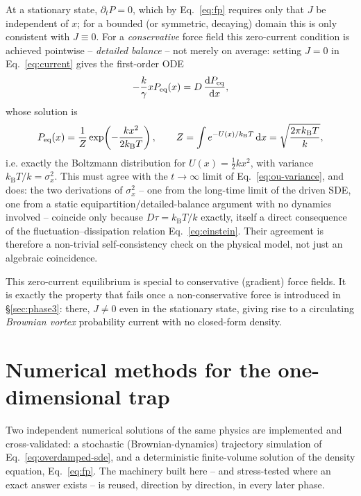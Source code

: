 \documentclass[11pt]{article}
\newcommand{\dd}{\mathrm{d}}
\newcommand{\kB}{k_{\mathrm{B}}}
\begin{document}
At a stationary state, $\partial_t P = 0$, which by Eq.~\eqref{eq:fp} requires only that $J$ be independent of $x$; for a bounded (or symmetric, decaying) domain this is only consistent with $J \equiv 0$. For a \emph{conservative} force field this zero-current condition is achieved pointwise -- \emph{detailed balance} -- not merely on average: setting $J=0$ in Eq.~\eqref{eq:current} gives the first-order ODE
\begin{equation}
-\frac{k}{\gamma}xP_{\rm eq}(x) = D\,\frac{\dd P_{\rm eq}}{\dd x},
\end{equation}
whose solution is
\begin{equation}
P_{\rm eq}(x) = \frac{1}{Z}\exp\!\left(-\frac{kx^2}{2\kB T}\right), \qquad Z = \int e^{-U(x)/\kB T}\,\dd x = \sqrt{\frac{2\pi \kB T}{k}},
\label{eq:boltzmann}
\end{equation}
i.e. exactly the Boltzmann distribution for $U(x)=\tfrac12 kx^2$, with variance $\kB T/k = \sigma_x^2$. This must agree with the $t\to\infty$ limit of Eq.~\eqref{eq:ou-variance}, and does: the two derivations of $\sigma_x^2$ -- one from the long-time limit of the driven SDE, one from a static equipartition/detailed-balance argument with no dynamics involved -- coincide only because $D\tau = \kB T/k$ exactly, itself a direct consequence of the fluctuation--dissipation relation Eq.~\eqref{eq:einstein}. Their agreement is therefore a non-trivial self-consistency check on the physical model, not just an algebraic coincidence.

This zero-current equilibrium is special to conservative (gradient) force fields. It is exactly the property that fails once a non-conservative force is introduced in \S\ref{sec:phase3}: there, $J\neq 0$ even in the stationary state, giving rise to a circulating \emph{Brownian vortex} probability current with no closed-form density.

\section{Numerical methods for the one-dimensional trap}
\label{sec:numerics1d}

Two independent numerical solutions of the same physics are implemented and cross-validated: a stochastic (Brownian-dynamics) trajectory simulation of Eq.~\eqref{eq:overdamped-sde}, and a deterministic finite-volume solution of the density equation, Eq.~\eqref{eq:fp}. The machinery built here -- and stress-tested where an exact answer exists -- is reused, direction by direction, in every later phase.
\end{document}
